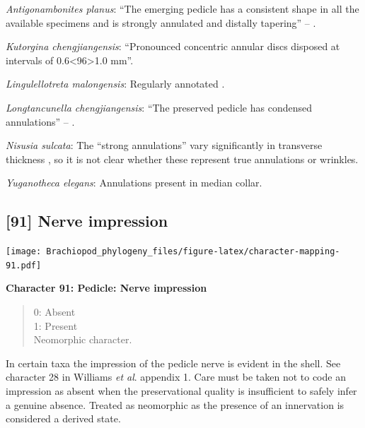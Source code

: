 \documentclass[openany]{book}
\theoremstyle{definition}
\theoremstyle{definition}
\theoremstyle{definition}
\theoremstyle{remark}
\begin{document}
\hypertarget{Antigonambonites_planus-coding-90}{}
\emph{Antigonambonites planus}: ``The emerging pedicle has a consistent
shape in all the available specimens and is strongly annulated and
distally tapering'' -- \citet{Holmer2018Evolutionarysignificance}.

\hypertarget{Kutorgina_chengjiangensis-coding-90}{}
\emph{Kutorgina chengjiangensis}: ``Pronounced concentric annular discs
disposed at intervals of 0.6\textless{}96\textgreater{}1.0 mm''.

\hypertarget{Lingulellotreta_malongensis-coding-90}{}
\emph{Lingulellotreta malongensis}: Regularly annotated \citep[see fig.
14.9 in][]{Hou2017Brachiopoda}.

\hypertarget{Longtancunella_chengjiangensis-coding-90}{}
\emph{Longtancunella chengjiangensis}: ``The preserved pedicle has
condensed annulations'' -- \citet{Zhang2011Theexceptionally}.

\hypertarget{Nisusia_sulcata-coding-90}{}
\emph{Nisusia sulcata}: The ``strong annulations'' vary significantly in
transverse thickness \citep{Holmer2018Evolutionarysignificance}, so it
is not clear whether these represent true annulations or wrinkles.

\hypertarget{Yuganotheca_elegans-coding-90}{}
\emph{Yuganotheca elegans}: Annulations present in median collar.

\subsection*{{[}91{]} Nerve impression}\label{nerve-impression}

\texttt{[image: Brachiopod\_phylogeny\_files/figure-latex/character-mapping-91.pdf]}

\textbf{Character 91: Pedicle: Nerve impression}

\begin{quote}
0: Absent\\
1: Present\\
Neomorphic character.
\end{quote}

In certain taxa the impression of the pedicle nerve is evident in the
shell. See character 28 in Williams \emph{et al}.
\citeyearpar{Williams1998Thediversity} appendix 1. Care must be taken
not to code an impression as absent when the preservational quality is
insufficient to safely infer a genuine absence. Treated as neomorphic as
the presence of an innervation is considered a derived state.
\end{document}
